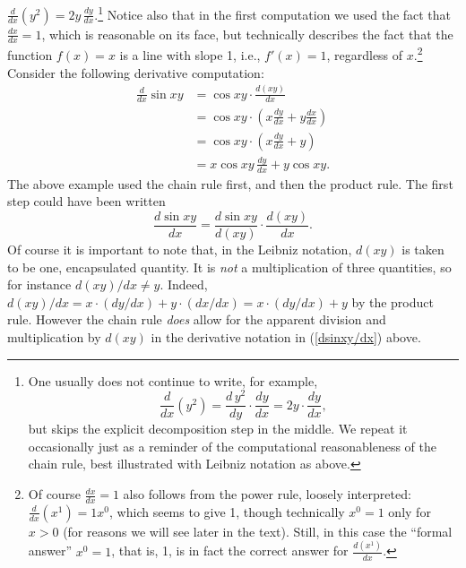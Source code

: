 $\frac{d}{dx}(y^2)=2y\,\frac{dy}{dx}$.\footnote{%
One usually does not continue to write, for example,
$$\frac{d}{dx}\left(y^2\right)=\frac{d\,y^2}{dy}\cdot\frac{dy}{dx}
=2y\cdot\frac{dy}{dx},$$
but skips the explicit decomposition step in the middle.
We repeat it occasionally just as a reminder of the computational
reasonableness of the chain rule, best illustrated with Leibniz notation
as above.} 
 Notice also that in the first computation
we used the fact that $\frac{dx}{dx}=1$, which is reasonable on its 
face, but technically describes the fact that the function $f(x)=x$
is a line with slope 1, i.e., $f'(x)=1$, regardless of $x$.\footnote{
Of course $\frac{dx}{dx}=1$ also follows from the power rule, loosely
interpreted: $\frac{d}{dx}(x^1)=1x^0$, which seems to 
give 1, though technically $x^0=1$ only for $x>0$ (for reasons
we will see later in the text). Still, in this case
the ``formal answer'' $x^0=1$, that is, 1, is in fact the correct answer
for $\frac{d(x^1)}{dx}$. }
\bex Consider the following derivative computation:
\begin{align*}
\frac{d}{dx}\sin xy&=\cos xy\cdot\frac{d(xy)}{dx}\\
    &=\cos xy\cdot\left(x\frac{dy}{dx}+y\frac{dx}{dx}\right)\\
    &=\cos xy\cdot\left(x\frac{dy}{dx}+y\right)\\
    &=x\cos xy\,\frac{dy}{dx}+y\cos xy.\end{align*}
\eex
The above example used the chain rule first, and then 
the product rule.  The first step could have been
written
\begin{equation}
\frac{d\sin xy}{dx}=\frac{d\sin xy}{d(xy)}\cdot\frac{d(xy)}{dx}.
\label{dsinxy/dx}\end{equation}
Of course it is important to note that, in the Leibniz notation,
$d(xy)$ is taken to be one, encapsulated quantity.
It is {\it not} a multiplication of three quantities,
so for instance $d(xy)/dx\ne y$.
Indeed, $d(xy)/dx=x\cdot(dy/dx) + y\cdot (dx/dx)=
x\cdot (dy/dx)+y$ by the product rule.  However the
chain rule {\it does} allow for the apparent 
division and multiplication by $d(xy)$ in the 
derivative notation in (\ref{dsinxy/dx}) above. 


